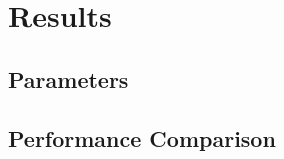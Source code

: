 \documentclass[main.tex]{subfiles}
\begin{document}
\chapter{Results}
\section{Parameters}
\section{Performance Comparison}
\end{document}
